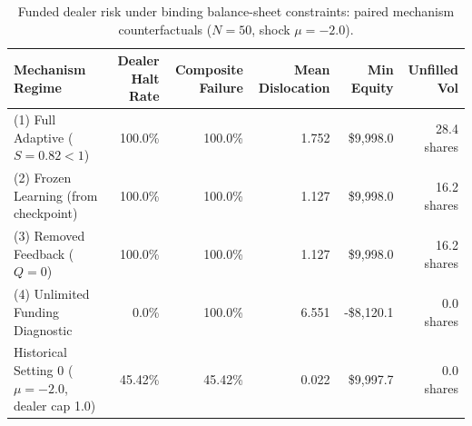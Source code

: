 \begin{table}[htbp]
\centering\small
\caption{Funded dealer risk under binding balance-sheet constraints: paired mechanism counterfactuals ($N=50$, shock $\mu=-2.0$).}
\label{tab:T8_funded_outcomes}
\begin{tabular}{lrrrrr}
\toprule
Mechanism Regime & Dealer Halt Rate & Composite Failure & Mean Dislocation & Min Equity & Unfilled Vol \\
\midrule
(1) Full Adaptive ($S=0.82 < 1$) & 100.0\% & 100.0\% & 1.752 & \$9,998.0 & 28.4 shares \\
(2) Frozen Learning (from checkpoint) & 100.0\% & 100.0\% & 1.127 & \$9,998.0 & 16.2 shares \\
(3) Removed Feedback ($Q=0$) & 100.0\% & 100.0\% & 1.127 & \$9,998.0 & 16.2 shares \\
(4) Unlimited Funding Diagnostic & 0.0\% & 100.0\% & 6.551 & -\$8,120.1 & 0.0 shares \\
\midrule
Historical Setting 0 ($\mu=-2.0$, dealer cap 1.0) & 45.42\% & 45.42\% & 0.022 & \$9,997.7 & 0.0 shares \\
\bottomrule
\end{tabular}
\end{table}
